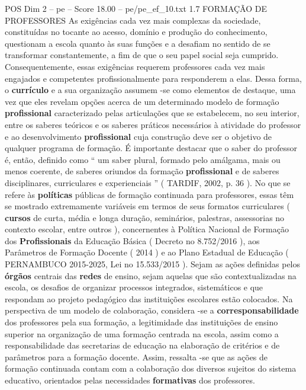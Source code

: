 \begin{textsample}{POS Dim 2 – pe – Score 18.00 – pe/pe\_ef\_10.txt}  \label{ex:f2_pos_260}
1.7 FORMAÇÃO DE PROFESSORES As exigências cada vez mais complexas da sociedade, constituídas no tocante ao acesso, domínio e produção do conhecimento, questionam a escola quanto às suas funções e a desafiam no sentido de se transformar constantemente, a fim de que o seu papel social seja cumprido.
Consequentemente, essas exigências requerem professores cada vez mais engajados e competentes profissionalmente para responderem a elas.
Dessa forma, o \textbf{currículo} e a sua organização assumem -se como elementos de destaque, uma vez que eles revelam opções acerca de um determinado modelo de formação \textbf{profissional} caracterizado pelas articulações que se estabelecem, no seu interior, entre os saberes teóricos e os saberes práticos necessários à atividade do professor e ao desenvolvimento \textbf{profissional} cuja construção deve ser o objetivo de qualquer programa de formação.
É importante destacar que o saber do professor é, então, definido como “ um saber plural, formado pelo amálgama, mais ou menos coerente, de saberes oriundos da formação \textbf{profissional} e de saberes disciplinares, curriculares e experienciais ” ( TARDIF, 2002, p. 36 ).
No que se refere às \textbf{políticas} públicas de formação continuada para professores, essas têm se mostrado extremamente variáveis em termos de seus formatos curriculares ( \textbf{cursos} de curta, média e longa duração, seminários, palestras, assessorias no contexto escolar, entre outros ), concernentes à Política Nacional de Formação dos \textbf{Profissionais} da Educação Básica ( Decreto no 8.752/2016 ), aos Parâmetros de Formação Docente ( 2014 ) e ao Plano Estadual de Educação ( PERNAMBUCO 2015-2025, Lei no 15.533/2015 ).
Sejam as ações definidas pelos \textbf{órgãos} centrais das \textbf{redes} de ensino, sejam aquelas que são contextualizadas na escola, os desafios de organizar processos integrados, sistemáticos e que respondam ao projeto pedagógico das instituições escolares estão colocados.
Na perspectiva de um modelo de colaboração, considera -se a \textbf{corresponsabilidade} dos professores pela sua formação, a legitimidade das instituições de ensino superior na organização de uma formação centrada na escola, assim como a responsabilidade das secretarias de educação na elaboração de critérios e de parâmetros para a formação docente.
Assim, ressalta -se que as ações de formação continuada contam com a colaboração dos diversos sujeitos do sistema educativo, orientados pelas necessidades \textbf{formativas} dos professores.

\end{textsample}
